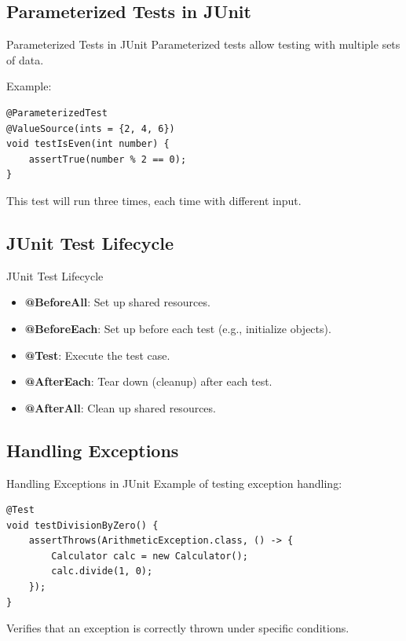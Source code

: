 \documentclass{beamer}
\begin{document}
\subsection{Parameterized Tests in JUnit}

\begin{frame}[fragile]{Parameterized Tests in JUnit}
	Parameterized tests allow testing with multiple sets of data.

	Example:
	\begin{lstlisting}
@ParameterizedTest
@ValueSource(ints = {2, 4, 6})
void testIsEven(int number) {
    assertTrue(number % 2 == 0);
}
	\end{lstlisting}
	This test will run three times, each time with different input.
\end{frame}

\subsection{JUnit Test Lifecycle}

\begin{frame}{JUnit Test Lifecycle}
	\begin{itemize}
		\item \textbf{@BeforeAll}: Set up shared resources.
		\item \textbf{@BeforeEach}: Set up before each test (e.g., initialize objects).
		\item \textbf{@Test}: Execute the test case.
		\item \textbf{@AfterEach}: Tear down (cleanup) after each test.
		\item \textbf{@AfterAll}: Clean up shared resources.
	\end{itemize}
\end{frame}

\subsection{Handling Exceptions }

\begin{frame}[fragile]{Handling Exceptions in JUnit}
	Example of testing exception handling:
	\begin{lstlisting}
@Test
void testDivisionByZero() {
    assertThrows(ArithmeticException.class, () -> {
        Calculator calc = new Calculator();
        calc.divide(1, 0);
    });
}
	\end{lstlisting}
	Verifies that an exception is correctly thrown under specific conditions.
\end{frame}
\end{document}
